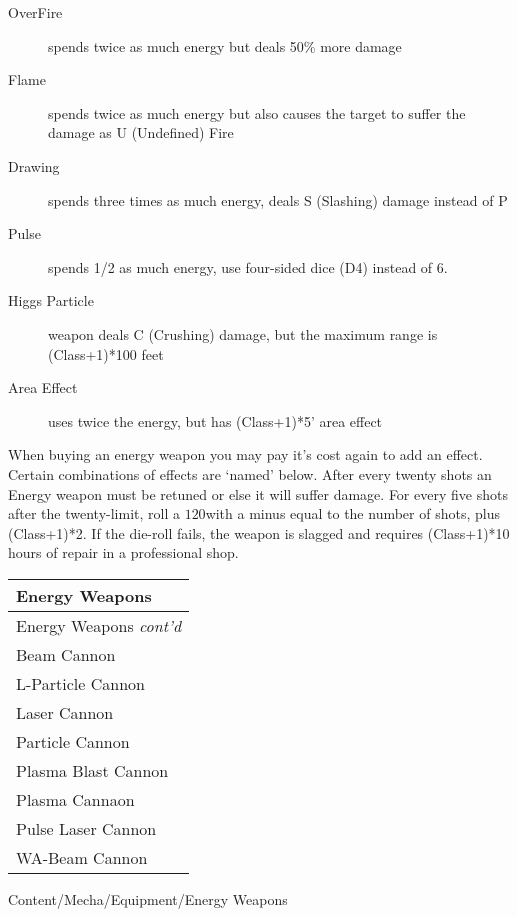\documentclass[twoside]{book}
\begin{document}
\begin{description}
    
  \item[ OverFire ]   spends twice as much energy but deals 50\% more
                 damage 
  \item[ Flame ]   spends twice as much energy but also causes the
                 target to suffer the damage as U (Undefined) Fire
                 
  \item[ Drawing ]   spends three times as much energy, deals S
                 (Slashing) damage instead of P 
  \item[ Pulse ]   spends 1/2 as much energy, use four-sided dice
                 (D4) instead of 6. 
  \item[ Higgs Particle ]   weapon deals C (Crushing) damage, but the maximum
                 range is (Class+1)*100 feet 
  \item[ Area Effect ]   uses twice the energy, but has (Class+1)*5'
                 area effect 
\end{description}
    When buying an energy weapon you may pay it's
               cost again to add an effect. Certain combinations of
               effects are `named' below.   After every twenty shots an Energy weapon must be
               retuned or else it will suffer damage. For every five
               shots after the twenty-limit, roll a \ensuremath{1}\ensuremath{20}\ensuremath{}with a minus
               equal to the number of shots, plus (Class+1)*2. If the
               die-roll fails, the weapon is slagged and requires
               (Class+1)*10 hours of repair in a professional shop.
               
\begin{longtable}{p{1.25in}} 
  Energy Weapons
  \\
  \hline
  \hline
  \endfirsthead
  Energy Weapons \textit{cont'd}
        
  \\
  \endhead
      
  \raggedright
           Beam Cannon 
  \tabularnewline
  \hline
      
  \raggedright
           L-Particle Cannon 
  \tabularnewline
  \hline
      
  \raggedright
           Laser Cannon 
  \tabularnewline
  \hline
      
  \raggedright
           Particle Cannon 
  \tabularnewline
  \hline
      
  \raggedright
           Plasma Blast Cannon 
  \tabularnewline
  \hline
      
  \raggedright
           Plasma Cannaon 
  \tabularnewline
  \hline
      
  \raggedright
           Pulse Laser Cannon 
  \tabularnewline
  \hline
      
  \raggedright
           WA-Beam Cannon 
  \tabularnewline
  \hline
      
\end{longtable}
    Content/Mecha/Equipment/Energy Weapons
\hspace{-2ex}
\end{document}
